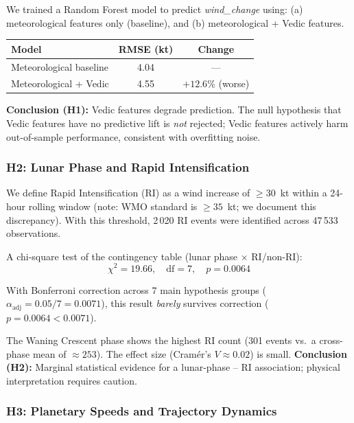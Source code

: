 \documentclass[12pt,a4paper]{article}
\begin{document}
We trained a Random Forest model to predict \textit{wind\_change} using:
(a) meteorological features only (baseline), and
(b) meteorological + Vedic features.

\begin{center}
\begin{tabular}{lcc}
\toprule
\textbf{Model} & \textbf{RMSE (kt)} & \textbf{Change} \\
\midrule
Meteorological baseline & 4.04 & --- \\
Meteorological + Vedic  & 4.55 & $+12.6\%$ (worse) \\
\bottomrule
\end{tabular}
\end{center}

\textbf{Conclusion (H1):} Vedic features degrade prediction. The null hypothesis
that Vedic features have no predictive lift is \emph{not} rejected; Vedic features
actively harm out-of-sample performance, consistent with overfitting noise.

\subsubsection{H2: Lunar Phase and Rapid Intensification}

We define Rapid Intensification (RI) as a wind increase of $\geq 30$~kt within
a 24-hour rolling window (note: WMO standard is $\geq 35$~kt; we document this
discrepancy). With this threshold, 2\,020 RI events were identified across
47\,533 observations.

A chi-square test of the contingency table (lunar phase $\times$ RI/non-RI):
\begin{equation}
  \chi^2 = 19.66, \quad \text{df} = 7, \quad p = 0.0064
\end{equation}

With Bonferroni correction across 7 main hypothesis groups
($\alpha_{\text{adj}} = 0.05/7 = 0.0071$), this result \emph{barely} survives
correction ($p = 0.0064 < 0.0071$).

The Waning Crescent phase shows the highest RI count (301 events vs.\ a
cross-phase mean of $\approx 253$). The effect size (Cram\'er's $V \approx 0.02$)
is small. \textbf{Conclusion (H2):} Marginal statistical evidence for a
lunar-phase -- RI association; physical interpretation requires caution.

\subsubsection{H3: Planetary Speeds and Trajectory Dynamics}
\end{document}
